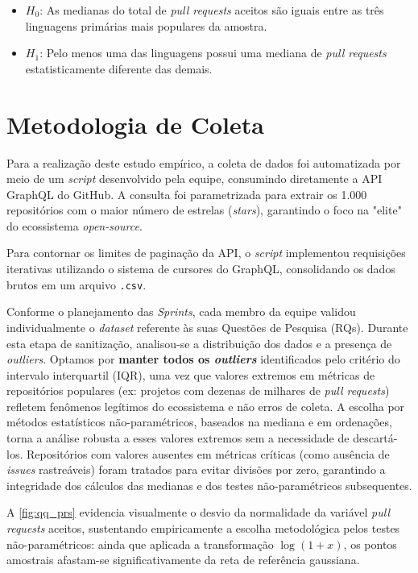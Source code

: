 \documentclass[
	article,			%
	11pt,				%
	oneside,			%
	a4paper,			%
	english,			%
	brazil,				%
	sumario=tradicional
	]{abntex2}
\begin{document}
\begin{itemize}
    \item $H_0$: As medianas do total de \textit{pull requests} aceitos são iguais entre as três linguagens primárias mais populares da amostra.
    \item $H_1$: Pelo menos uma das linguagens possui uma mediana de \textit{pull requests} estatisticamente diferente das demais.
\end{itemize}

% 

\section{Metodologia de Coleta}
\label{sec:metodologia}

Para a realização deste estudo empírico, a coleta de dados foi automatizada por meio de um \textit{script} desenvolvido pela equipe, consumindo diretamente a API GraphQL do GitHub. A consulta foi parametrizada para extrair os 1.000 repositórios com o maior número de estrelas (\textit{stars}), garantindo o foco na "elite" do ecossistema \textit{open-source}.

Para contornar os limites de paginação da API, o \textit{script} implementou requisições iterativas utilizando o sistema de cursores do GraphQL, consolidando os dados brutos em um arquivo \texttt{.csv}. 

Conforme o planejamento das \textit{Sprints}, cada membro da equipe validou individualmente o \textit{dataset} referente às suas Questões de Pesquisa (RQs). Durante esta etapa de sanitização, analisou-se a distribuição dos dados e a presença de \textit{outliers}. Optamos por \textbf{manter todos os \textit{outliers}} identificados pelo critério do intervalo interquartil (IQR), uma vez que valores extremos em métricas de repositórios populares (ex: projetos com dezenas de milhares de \textit{pull requests}) refletem fenômenos legítimos do ecossistema e não erros de coleta. A escolha por métodos estatísticos não-paramétricos, baseados na mediana e em ordenações, torna a análise robusta a esses valores extremos sem a necessidade de descartá-los. Repositórios com valores ausentes em métricas críticas (como ausência de \textit{issues} rastreáveis) foram tratados para evitar divisões por zero, garantindo a integridade dos cálculos das medianas e dos testes não-paramétricos subsequentes.

A \autoref{fig:qq_prs} evidencia visualmente o desvio da normalidade da variável \textit{pull requests} aceitos, sustentando empiricamente a escolha metodológica pelos testes não-paramétricos: ainda que aplicada a transformação $\log(1+x)$, os pontos amostrais afastam-se significativamente da reta de referência gaussiana.
\end{document}
